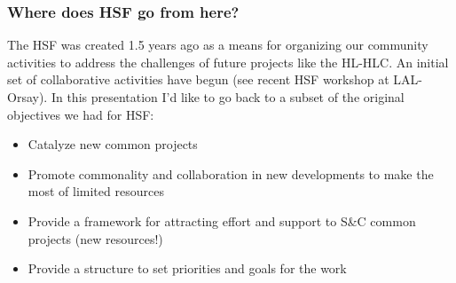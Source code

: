 \begin{frame}
 \frametitle{Where does HSF go from here?}
The HSF was created 1.5 years ago as a means for organizing our community activities to address the challenges of future projects like the HL-HLC.
An initial set of collaborative activities have begun (see recent HSF workshop 
at LAL-Orsay). In this presentation I'd like to go back to a subset of the original objectives we had for HSF:

\begin{itemize}
\item Catalyze new common projects
\item Promote commonality and collaboration in new developments to make the most of limited resources
\item Provide a framework for attracting effort and support to S\&C common projects (new resources!)
\item Provide a structure to set priorities and goals for the work
\end{itemize}


\end{frame}


